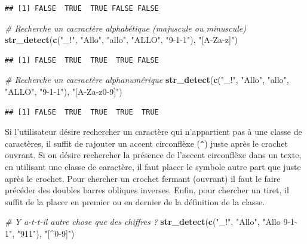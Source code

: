 \documentclass[
  11pt,
]{book}
\newenvironment{Shaded}{\begin{snugshade}}{\end{snugshade}}
\newcommand{\CommentTok}[1]{\textcolor[rgb]{0.56,0.35,0.01}{\textit{#1}}}
\newcommand{\KeywordTok}[1]{\textcolor[rgb]{0.13,0.29,0.53}{\textbf{#1}}}
\newcommand{\NormalTok}[1]{#1}
\newcommand{\StringTok}[1]{\textcolor[rgb]{0.31,0.60,0.02}{#1}}
\numberwithin{equation}{section}
\numberwithin{countremarque}{section}
\begin{document}
\begin{lstlisting}
## [1] FALSE  TRUE  TRUE FALSE FALSE
\end{lstlisting}

\begin{Shaded}
\begin{Highlighting}[]
\CommentTok{\# Recherche un cacractère alphabétique (majuscule ou minuscule)}
\KeywordTok{str\_detect}\NormalTok{(}\KeywordTok{c}\NormalTok{(}\StringTok{"\_!"}\NormalTok{, }\StringTok{"Allo"}\NormalTok{, }\StringTok{"allo"}\NormalTok{, }\StringTok{"ALLO"}\NormalTok{, }\StringTok{"9{-}1{-}1"}\NormalTok{), }\StringTok{"[A{-}Za{-}z]"}\NormalTok{)}
\end{Highlighting}
\end{Shaded}

\begin{lstlisting}
## [1] FALSE  TRUE  TRUE  TRUE FALSE
\end{lstlisting}

\begin{Shaded}
\begin{Highlighting}[]
\CommentTok{\# Recherche un cacractère alphanumérique}
\KeywordTok{str\_detect}\NormalTok{(}\KeywordTok{c}\NormalTok{(}\StringTok{"\_!"}\NormalTok{, }\StringTok{"Allo"}\NormalTok{, }\StringTok{"allo"}\NormalTok{, }\StringTok{"ALLO"}\NormalTok{, }\StringTok{"9{-}1{-}1"}\NormalTok{), }\StringTok{"[A{-}Za{-}z0{-}9]"}\NormalTok{)}
\end{Highlighting}
\end{Shaded}

\begin{lstlisting}
## [1] FALSE  TRUE  TRUE  TRUE  TRUE
\end{lstlisting}

Si l'utilisateur désire rechercher un caractère qui n'appartient pas à une classe de caractères, il suffit de rajouter un accent circonflèxe (\texttt{\^{}}) juste après le crochet ouvrant. Si on désire rechercher la présence de l'accent circonflèxe dans un texte, en utilisant une classe de caractère, il faut placer le symbole autre part que juste après le crochet. Pour chercher un crochet fermant (ouvrant) il faut le faire précéder des doubles barres obliques inverses. Enfin, pour chercher un tiret, il suffit de la placer en premier ou en dernier de la définition de la classe.

\begin{Shaded}
\begin{Highlighting}[]
\CommentTok{\# Y a{-}t{-}t{-}il autre chose que des chiffres ?}
\KeywordTok{str\_detect}\NormalTok{(}\KeywordTok{c}\NormalTok{(}\StringTok{"\_!"}\NormalTok{, }\StringTok{"Allo"}\NormalTok{, }\StringTok{"Allo 9{-}1{-}1"}\NormalTok{, }\StringTok{"911"}\NormalTok{), }\StringTok{"[\^{}0{-}9]"}\NormalTok{)}
\end{Highlighting}
\end{Shaded}
\end{document}
